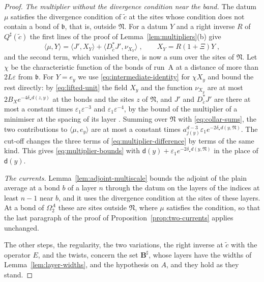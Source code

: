 \begin{proof}
\emph{The multiplier without the divergence condition near the band.} The datum $\mu$ satisfies the divergence condition of $\tilde c$ at the sites whose condition does not contain a bond of $\mathfrak b$, that is, outside $\mathfrak N$. For a datum $Y$ and a right inverse $R$ of $Q^\sharp(\tilde c)$ the first lines of the proof of Lemma~\ref{lem:multipliers}(b) give
\[
    \langle\mu, Y\rangle = \langle J', X_Y\rangle + \langle D^*_{\tilde c}J', \nu_{X_Y}\rangle\;,
    \qquad
    X_Y = R(1 + \Xi)Y\;,
\]
and the second term, which vanished there, is now a sum over the sites of $\mathfrak N$. Let $\chi$ be the characteristic function of the bonds of run~A at a distance of more than $2L\varepsilon$ from $\mathfrak b$. For $Y = e_y$ we use \eqref{eq:intermediate-identity} for $\chi X_y$ and bound the rest directly: by \eqref{eq:lifted-unit} the field $X_y$ and the function $\nu_{X_y}$ are at most $2B_Xe^{-4\delta_\star d(z,y)}$ at the bonds and the sites $z$ of $\mathfrak N$, and $J'$ and $D^*_{\tilde c}J'$ are there at most a constant times $\varepsilon_1\varepsilon^{-3}$ and $\varepsilon_1\varepsilon^{-4}$, by the bound of the multiplier of a minimiser at the spacing of its layer \cite[Theorem~1, (9), (10)]{BalabanVAR}. Summing over $\mathfrak N$ with \eqref{eq:collar-sums}, the two contributions to $\langle\mu, e_y\rangle$ are at most a constant times $a_{j(y)}^{d-3}\varepsilon_1e^{-2\delta_\star d(y,\mathfrak N)}$. The cut-off changes the three terms of \eqref{eq:multiplier-difference} by terms of the same kind. This gives \eqref{eq:multiplier-bounds} with $\mathsf d(y) + \varepsilon_1e^{-2\delta_\star d(y,\mathfrak N)}$ in the place of $\mathsf d(y)$.

\emph{The currents.} Lemma~\ref{lem:adjoint-multiscale} bounds the adjoint of the plain average at a bond $b$ of a layer $n$ through the datum on the layers of the indices at least $n - 1$ near $b$, and it uses the divergence condition at the sites of these layers. At a bond of $\Omega^A_2$ these are sites outside $\mathfrak N$, where $\mu$ satisfies the condition, so that the last paragraph of the proof of Proposition~\ref{prop:two-currents} applies unchanged.

The other steps, the regularity, the two variations, the right inverse at $\tilde c$ with the operator $E$, and the twists, concern the set $\mathbf B^\sharp$, whose layers have the widths of Lemma~\ref{lem:layer-widths}, and the hypothesis on $A$, and they hold as they stand.
\end{proof}

